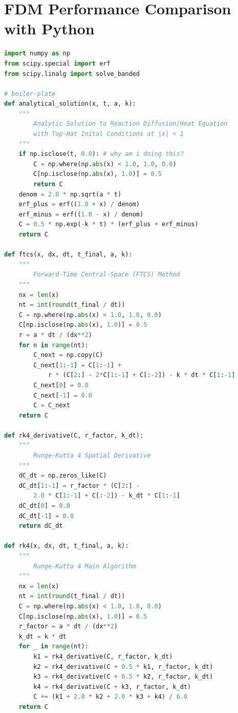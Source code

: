 \section{FDM Performance Comparison with Python}


\captionsetup[lstlisting]{font=large} 

\begin{lstlisting}[language=Python, title={fdsolvers.py}]
import numpy as np
from scipy.special import erf
from scipy.linalg import solve_banded

# boiler-plate
def analytical_solution(x, t, a, k):
    """
        Analytic Solution to Reaction Diffusion/Heat Equation
        with Top-Hat Inital Conditions at |x| < 1
    """
    if np.isclose(t, 0.0): # why am i doing this?
        C = np.where(np.abs(x) < 1.0, 1.0, 0.0)
        C[np.isclose(np.abs(x), 1.0)] = 0.5
        return C        
    denom = 2.0 * np.sqrt(a * t)
    erf_plus = erf((1.0 + x) / denom)
    erf_minus = erf((1.0 - x) / denom)    
    C = 0.5 * np.exp(-k * t) * (erf_plus + erf_minus)
    return C
    
def ftcs(x, dx, dt, t_final, a, k):
    """
        Forward-Time Central-Space (FTCS) Method
    """
    nx = len(x)
    nt = int(round(t_final / dt))
    C = np.where(np.abs(x) < 1.0, 1.0, 0.0)
    C[np.isclose(np.abs(x), 1.0)] = 0.5
    r = a * dt / (dx**2)    
    for n in range(nt):
        C_next = np.copy(C)
        C_next[1:-1] = C[1:-1] + 
            r * (C[2:] - 2*C[1:-1] + C[:-2]) - k * dt * C[1:-1]
        C_next[0] = 0.0
        C_next[-1] = 0.0        
        C = C_next
    return C

def rk4_derivative(C, r_factor, k_dt):
    """
        Runge-Kutta 4 Spatial Derivative
    """
    dC_dt = np.zeros_like(C)
    dC_dt[1:-1] = r_factor * (C[2:] - 
        2.0 * C[1:-1] + C[:-2]) - k_dt * C[1:-1]
    dC_dt[0] = 0.0
    dC_dt[-1] = 0.0
    return dC_dt

def rk4(x, dx, dt, t_final, a, k):
    """
        Runge-Kutta 4 Main Algorithm
    """
    nx = len(x)
    nt = int(round(t_final / dt))
    C = np.where(np.abs(x) < 1.0, 1.0, 0.0)
    C[np.isclose(np.abs(x), 1.0)] = 0.5
    r_factor = a * dt / (dx**2)
    k_dt = k * dt
    for _ in range(nt):
        k1 = rk4_derivative(C, r_factor, k_dt)
        k2 = rk4_derivative(C + 0.5 * k1, r_factor, k_dt)
        k3 = rk4_derivative(C + 0.5 * k2, r_factor, k_dt)
        k4 = rk4_derivative(C + k3, r_factor, k_dt)
        C += (k1 + 2.0 * k2 + 2.0 * k3 + k4) / 6.0
    return C


\end{lstlisting}
